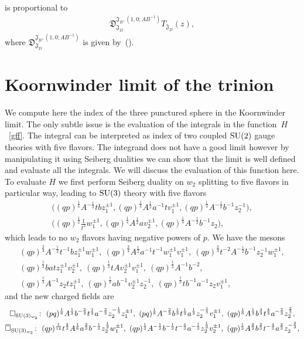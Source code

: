 \documentclass[a4paper,12pt]{article}
\begin{document}
is proportional to
\begin{gather*}
 {\mathfrak D}_{{\mathfrak J}_D}^{{\mathfrak J}_B,(1,0;AB^{-1})} T_{{\mathfrak J}_D}(z) ,
\end{gather*}
where ${\mathfrak D}_{{\mathfrak J}_D}^{{\mathfrak J}_B,(1,0;AB^{-1})}$ is given by~().
\section{Koornwinder limit of the trinion}
We compute here the index of the three punctured sphere in the Koornwinder limit. The only subtle issue is the evaluation of the integrals in the function~$H$~\eqref{gff}. The integral can be interpreted as index of two coupled ${\rm SU}(2)$ gauge theories with five flavors. The integrand does not have a good limit however by manipulating it using Seiberg dualities we can show that the limit is well defined and evaluate all the integrals. We will discuss the evaluation of this function here.
To evaluate $H$ we first perform Seiberg duality on $w_2$ splitting to five flavors in particular way, leading to ${\rm SU}(3)$ theory with five flavors
\begin{gather*}
\big((qp)^{\frac14}A^{-\frac12} t b z_1^{\pm1} , (qp)^{\frac14} A^{\frac12} a^{-1} t v_1^{\pm1} , (q p)^{\frac14} A^{-\frac12} b^{-1} z_2^{-1}\big) , \\
\big((q p)^{\frac12}\frac1{t^2} w_1^{\pm1} , (q p)^{\frac14} A^{\frac12}a v_2^{\pm1} , (q p)^{\frac14}A^{-\frac12}b^{-1} z_2\big) ,
\end{gather*} which leads to no $w_2$ flavors having negative powers of $p$. We have the mesons
\begin{gather*}
(q p)^{\frac34}A^{-\frac12}t^{-1} b z_1^{\pm1}w_1^{\pm1} , \ (q p)^{\frac34} A^{\frac12} a^{-1} t^{-1} w_1^{\pm1}v_1^{\pm1} , \ (q p)^{\frac34} t^{-2} A^{-\frac12} b^{-1} z_2^{-1} w_1^{\pm1} , \\
 (q p)^{\frac12} b a t z_1^{\pm1} v_2^{\pm1} , \ (q p)^{\frac12} t A v_2^{\pm1} v_1^{\pm1} , \ (q p)^{\frac12} A^{-1} b^{-2} , \\
 (q p) ^{\frac12} A^{-1} z_2 t z_1^{\pm1} , \ (q p)^{\frac12} a b^{-1} v_2^{\pm1} z_2 ^{-1} , \ (q p)^{\frac12} t b^{-1} a^{-1} z_2 v_1^{\pm1} , \end{gather*}
and the new charged fields are
\begin{gather*}
\square_{{\rm SU}(3)_{w_2}} \colon \ (p q)^{\frac16}A^{\frac13}b^{-\frac23} t^{\frac13}a^{-\frac23} z_2^{-\frac13} z_1^{\pm1} , \ (p q)^{\frac16}A^{-\frac23}b^{\frac13} t^{\frac13}a^{\frac13} z_2^{-\frac13} v_1^{\pm1} , \
( q p)^{\frac16} A^{\frac13} b^{\frac43} t^{\frac43} a^{-\frac23} z_2^{\frac23} , \\
\overline \square _{{\rm SU}(3)_{w_2 } } \colon \ (q p)^{\frac1{ 1 2} } t^{\frac23}A^{\frac16}a^{\frac23} b^{-\frac13}z_2^{\frac13}w_1^{\pm1} , \
(q p) ^{\frac13} A^{-\frac13} b^{-\frac13} t^{-\frac43} a^{-\frac13} z_2^{\frac13} v_2^{\pm1} , \ ( q p )^{\frac13} A^{\frac23} b^{\frac23} t^{-\frac43} a^{\frac23} z_2^{-\frac23} ,
\end{gather*}
\end{document}
